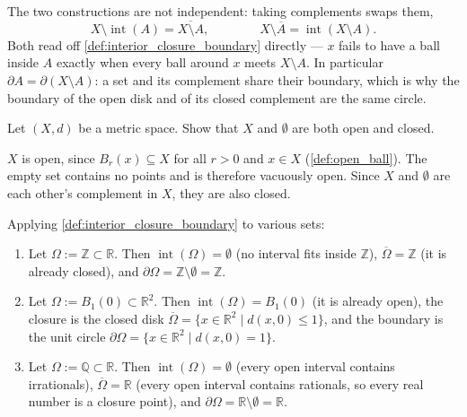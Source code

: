 \begin{remark}
\label{rem:interior_closure_dual}
The two constructions are not independent: taking complements swaps them,
\[X \setminus \operatorname{int}(A) = \overline{X\setminus A},
  \qquad\qquad
  X \setminus \overline{A} = \operatorname{int}(X\setminus A).\]
Both read off \cref{def:interior_closure_boundary} directly --- $x$ fails to have a ball inside
$A$ exactly when every ball around $x$ meets $X\setminus A$. In particular $\partial A =
\partial(X\setminus A)$: a set and its complement share their boundary, which is why the
boundary of the open disk and of its closed complement are the same circle.
\end{remark}

\begin{exercise}
\label{ex:X_empty_clopen}
Let $(X,d)$ be a metric space. Show that $X$ and $\emptyset$ are both open and closed.
\end{exercise}

\begin{exercisesolution}
$X$ is open, since $B_r(x) \subseteq X$ for all $r > 0$ and $x \in X$
(\cref{def:open_ball}). The empty set contains no
points and is therefore vacuously open. Since $X$ and $\emptyset$ are each other's complement in
$X$, they are also closed.
\end{exercisesolution}

\begin{example}
\label{ex:interior_closure_boundary_more}
Applying \cref{def:interior_closure_boundary} to various sets:
\begin{enumerate}[label=\textbf{(\alph*)}]
  \item Let $\Omega := \mathbb{Z} \subset \mathbb{R}$. Then $\operatorname{int}(\Omega) = \emptyset$ (no interval fits inside $\mathbb{Z}$), $\overline{\Omega} = \mathbb{Z}$ (it is already closed), and $\partial\Omega = \mathbb{Z} \setminus \emptyset = \mathbb{Z}$.
  \item Let $\Omega := B_1(0) \subset \mathbb{R}^2$. Then $\operatorname{int}(\Omega) = B_1(0)$ (it is already open), the closure is the closed disk $\overline{\Omega} = \{x \in \mathbb{R}^2 \mid d(x,0) \leq 1\}$, and the boundary is the unit circle $\partial\Omega = \{x \in \mathbb{R}^2 \mid d(x,0) = 1\}$.
  \item Let $\Omega := \mathbb{Q} \subset \mathbb{R}$. Then $\operatorname{int}(\Omega) = \emptyset$ (every open interval contains irrationals), $\overline{\Omega} = \mathbb{R}$ (every open interval contains rationals, so every real number is a closure point), and $\partial\Omega = \mathbb{R} \setminus \emptyset = \mathbb{R}$.
\end{enumerate}
\end{example}

